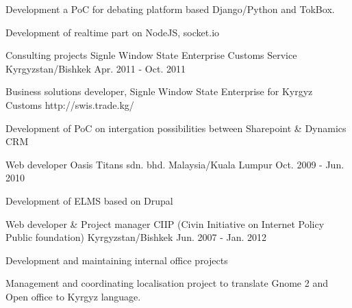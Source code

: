 \begin{cventries}
{      \begin{cvitems}
        \item {Development a PoC for debating platform based Django/Python and TokBox.}
        \item {Development of realtime part on NodeJS, socket.io}
      \end{cvitems}
    }
    \cventry
      {Consulting projects}
      {Signle Window State Enterprise Customs Service}
      {Kyrgyzstan/Bishkek}
      {Apr. 2011 - Oct. 2011}
      {
        \begin{cvitems}
          \item {Business solutions developer, Signle Window State Enterprise for Kyrgyz Customs http://swis.trade.kg/}
          \item {Development of PoC on intergation possibilities between Sharepoint \& Dynamics CRM}
        \end{cvitems}
      }
    \cventry
      {Web developer}
      {Oasis Titans sdn. bhd.}
      {Malaysia/Kuala Lumpur}
      {Oct. 2009 - Jun. 2010}
      {
        \begin{cvitems}
          \item {Development of ELMS based on Drupal}
        \end{cvitems}
      }
    \cventry
      {Web developer \& Project manager}
      {CIIP (Civin Initiative on Internet Policy Public foundation)}
      {Kyrgyzstan/Bishkek}
      {Jun. 2007 - Jan. 2012}
      {
        \begin{cvitems}
          \item {Development and maintaining internal office projects}
          \item {Management and coordinating localisation project to translate Gnome 2 and Open office to Kyrgyz language.}
        \end{cvitems}
      }
\end{cventries}
